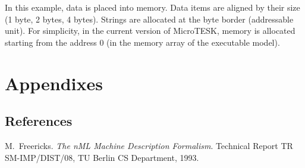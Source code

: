 \documentclass[oneside,final,12pt]{extreport}
\begin{document}
In this example, data is placed into memory. Data items are aligned by their size
(1 byte, 2 bytes, 4 bytes). Strings are allocated at the byte border (addressable
unit). For simplicity, in the current version of MicroTESK, memory is allocated
starting from the address 0 (in the memory array of the executable model).


\chapter{Appendixes}

\section{References}



\begin{thebibliography}{1}

M.~Freericks.
\emph{The nML Machine Description Formalism}.
Technical Report TR SM-IMP/DIST/08, TU Berlin CS Department, 1993.

\end{thebibliography}
\end{document}
